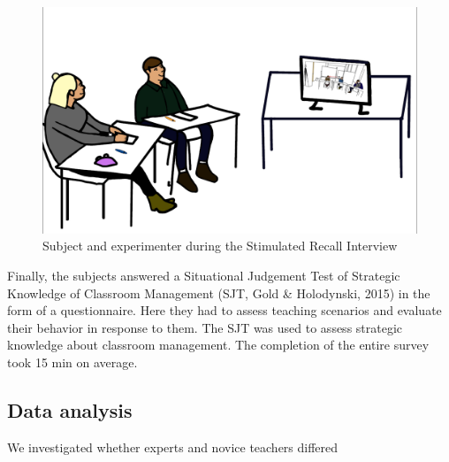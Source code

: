 \documentclass[
  man]{apa6}
\begin{document}
\begin{figure}

{\centering \includegraphics{./pictures/sri} 

}

\caption{Subject and experimenter during the Stimulated Recall Interview}\label{fig:sri}
\end{figure}

Finally, the subjects answered a Situational Judgement Test of Strategic Knowledge of Classroom Management (SJT, Gold \& Holodynski, 2015) in the form of a questionnaire. Here they had to assess teaching scenarios and evaluate their behavior in response to them. The SJT was used to assess strategic knowledge about classroom management. The completion of the entire survey took 15 min on average.

\subsection{Data analysis}\label{data-analysis}

We investigated whether experts and novice teachers differed
\end{document}
